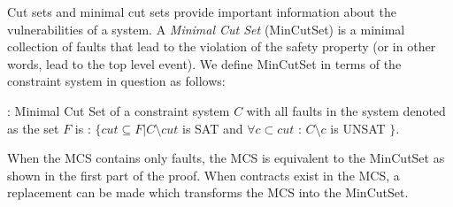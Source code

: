 Cut sets and minimal cut sets provide important information about the vulnerabilities of a system. A \textit{Minimal Cut Set} (MinCutSet) is a minimal collection of faults that lead to the violation of the safety property (or in other words, lead to the top level event). We define MinCutSet in terms of the constraint system in question as follows:\\

\begin{definition} : Minimal Cut Set of a constraint system $C$ with all faults in the system denoted as the set $F$ is : $\{ cut \subseteq F | C \setminus cut$ is SAT and $\forall c \subset cut$ : $C \setminus c$ is UNSAT $\}$. 
\end{definition}

When the MCS contains only faults, the MCS is equivalent to the MinCutSet as shown in the first part of the proof. When contracts exist in the MCS, a replacement can be made which transforms the MCS into the MinCutSet. 






